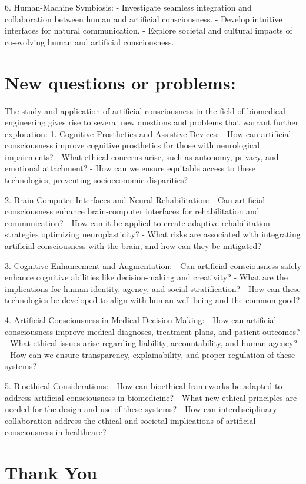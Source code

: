 \documentclass{article}
\begin{document}
6. Human-Machine Symbiosis:
   - Investigate seamless integration and collaboration between human and artificial consciousness.
   - Develop intuitive interfaces for natural communication.
   - Explore societal and cultural impacts of co-evolving human and artificial consciousness.
\section*{New questions or problems:}
The study and application of artificial consciousness in the field of biomedical engineering gives rise to several new questions and problems that warrant further exploration:
1. Cognitive Prosthetics and Assistive Devices:
   - How can artificial consciousness improve cognitive prosthetics for those with neurological impairments?
   - What ethical concerns arise, such as autonomy, privacy, and emotional attachment?
   - How can we ensure equitable access to these technologies, preventing socioeconomic disparities?

2. Brain-Computer Interfaces and Neural Rehabilitation:
   - Can artificial consciousness enhance brain-computer interfaces for rehabilitation and communication?
   - How can it be applied to create adaptive rehabilitation strategies optimizing neuroplasticity?
   - What risks are associated with integrating artificial consciousness with the brain, and how can they be mitigated?

3. Cognitive Enhancement and Augmentation:
   - Can artificial consciousness safely enhance cognitive abilities like decision-making and creativity?
   - What are the implications for human identity, agency, and social stratification?
   - How can these technologies be developed to align with human well-being and the common good?

4. Artificial Consciousness in Medical Decision-Making:
   - How can artificial consciousness improve medical diagnoses, treatment plans, and patient outcomes?
   - What ethical issues arise regarding liability, accountability, and human agency?
   - How can we ensure transparency, explainability, and proper regulation of these systems?

5. Bioethical Considerations:
   - How can bioethical frameworks be adapted to address artificial consciousness in biomedicine?
   - What new ethical principles are needed for the design and use of these systems?
   - How can interdisciplinary collaboration address the ethical and societal implications of artificial consciousness in healthcare?



\section* {Thank You}
\end{document}
